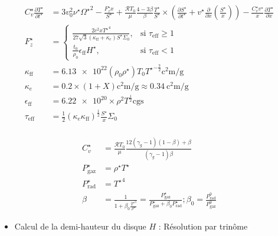 \documentclass[french]{beamer}
\begin{document}
\begin{frame}
	\begin{subequations}
    \begin{align}
    C_v^\star \frac{\partial T^{\star}}{\partial t^{\star}} &=
        3 v_0^2 \nu^\star {\Omega^\star}^2 - \frac{F_z^\star x}{S^\star} +
        \frac{\mathcal{R} T_0}{\mu} \frac{4-3\beta}{\beta} \frac{T^\star}{S^\star} \times
        \left( \frac{\partial S^\star}{\partial t^\star} + v^\star \frac{\partial}{\partial x} \left(\frac{S^\star}{x}\right) \right) -
        \frac{C_v^\star v^\star}{x} \frac{\partial T^\star}{\partial x}\\
        F_z^\star &=
        \begin{cases}
            \frac{2 c^2 x {T^\star}^4}{27 \sqrt{3} (\kappa_\mathrm{ff} + \kappa_e) S^\star \Sigma_0}, &\text{si $\tau_\mathrm{eff} \geq 1$} \\
            \frac{t_0}{\rho_0}\epsilon_\mathrm{ff} H^\star, &\text{si $\tau_\mathrm{eff} < 1$}
        \end{cases} \\
        \kappa_\mathrm{ff} &= \num{6.13e22} (\rho_0 \rho^\star) {T_0 T^\star}^{-\frac{7}{2}} \si{\square\centi\meter\per\gram} \\
        \kappa_e &= 0.2 \times (1 + X) \si{\square\centi\meter\per\gram} \approx \SI{0.34}{\square\centi\meter\per\gram} \\
        \epsilon_\mathrm{ff} &= \num{6.22e20} \times \rho^2 T^\frac{1}{2} \mathrm{cgs} \\
        \tau_\mathrm{eff} &= \frac{1}{2} (\kappa_e \kappa_\mathrm{ff})^\frac{1}{2} \frac{S^\star}{x} \Sigma_0 \\
    \end{align}
\end{subequations}
\end{frame} 

\begin{frame}
	\begin{subequations}
    \begin{align}
     C_v^\star &= \frac{\mathcal{R} T_0}{\mu} \frac{12 (\gamma_g - 1)(1 - \beta) + \beta}{(\gamma_g - 1) \beta} \\
        P_\mathrm{gaz}^\star &= \rho^\star T^\star \\
        P_\mathrm{rad}^\star &= {T^\star}^4 \\
        \beta &= \frac{1}{1 + \beta_0 \frac{{T^\star}^3}{\rho^\star}} = \frac{P_\mathrm{gaz}^\star}{P_\mathrm{gaz}^\star + \beta_0 P_\mathrm{rad}^\star} ; \beta_0 = \frac{P_\mathrm{rad}^0}{P_\mathrm{gaz}^0}
    \end{align}
\end{subequations}

	\begin{itemize}
		\item Calcul de la demi-hauteur du disque $H$ : Résolution par trinôme
	\end{itemize}
	
\end{frame} 
\end{document}
